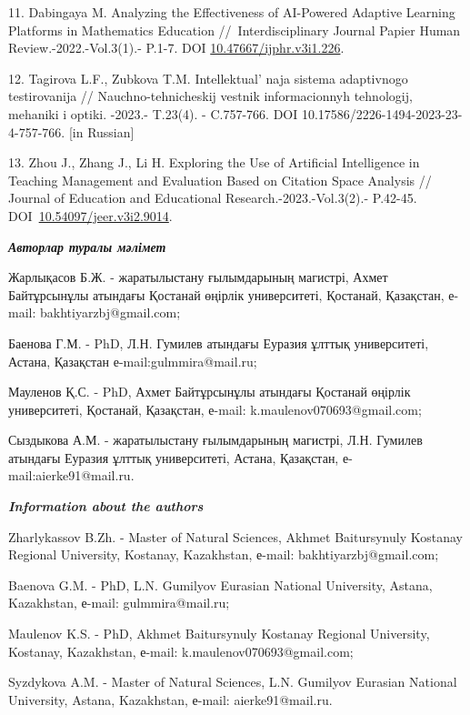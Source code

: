 \begin{refs}
11. Dabingaya M. Analyzing the Effectiveness of AI-Powered Adaptive
Learning Platforms in Mathematics Education //~Interdisciplinary Journal
Papier Human Review.-2022.-Vol.3(1).- P.1-7. DOI
\href{https://doi.org/10.47667/ijphr.v3i1.226}{10.47667/ijphr.v3i1.226}.

12. Tagirova L.F., Zubkova T.M. Intellektual' naja
sistema adaptivnogo testirovanija // Nauchno-tehnicheskij vestnik
informacionnyh tehnologij, mehaniki i optiki. -2023.- T.23(4). -
C.757-766. DOI 10.17586/2226-1494-2023-23-4-757-766. {[}in Russian{]}

13. Zhou J., Zhang J., Li H. Exploring the Use of Artificial
Intelligence in Teaching Management and Evaluation Based on Citation
Space Analysis // Journal of Education and Educational
Research.-2023.-Vol.3(2).- P.42-45.
DOI~\href{https://doi.org/10.54097/jeer.v3i2.9014}{10.54097/jeer.v3i2.9014}.
\end{refs}

\begin{info}
\hspace{1em}\emph{{\bfseries Авторлар туралы мәлімет}}

Жарлықасов Б.Ж. - жаратылыстану ғылымдарының магистрі, Ахмет
Байтұрсынұлы атындағы Қостанай өңірлік университеті, Қостанай,
Қазақстан, е-mail: bakhtiyarzbj@gmail.com;

Баенова Г.М. - PhD, Л.Н. Гумилев атындағы Еуразия ұлттық университеті,
Астана, Қазақстан е-mail:gulmmira@mail.ru;

Мауленов Қ.С. - PhD, Ахмет Байтұрсынұлы атындағы Қостанай өңірлік
университеті, Қостанай, Қазақстан, е-mail: k.maulenov070693@gmail.com;

Сыздыкова А.М. - жаратылыстану ғылымдарының магистрі, Л.Н. Гумилев
атындағы Еуразия ұлттық университеті, Астана, Қазақстан,
е-mail:aierke91@mail.ru.

\hspace{1em}\emph{{\bfseries Information about the authors}}

Zharlykassov B.Zh. - Master of Natural Sciences, Akhmet Baitursynuly
Kostanay Regional University, Kostanay, Kazakhstan, е-mail:
bakhtiyarzbj@gmail.com;

Baenova G.M. - PhD, L.N. Gumilyov Eurasian National University, Astana,
Kazakhstan, е-mail: gulmmira@mail.ru;

Maulenov K.S. - PhD, Akhmet Baitursynuly Kostanay Regional University,
Kostanay, Kazakhstan, е-mail: k.maulenov070693@gmail.com;

Syzdykova A.M. - Master of Natural Sciences, L.N. Gumilyov Eurasian
National University, Astana, Kazakhstan, е-mail: aierke91@mail.ru.
\end{info}
